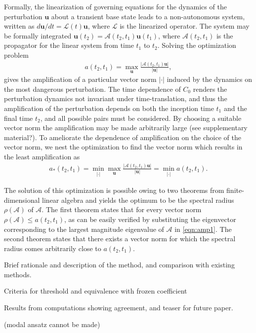 \documentclass[letterpaper,10pt,prl,twocolumn,aps,reprint]{revtex4-1}
\newcommand{\bu}{\boldsymbol{u}}
\newcommand{\cL}{\boldsymbol{\mathcal{L}}}
\newcommand{\cA}{\boldsymbol{\mathcal{A}}}
\begin{document}
Formally, the linearization of governing equations for the dynamics of the perturbation $\bu$ about a transient base state leads to a non-autonomous system, written as ${d\bu}/{dt} = \cL(t)\bu$, where $\cL$ is the linearized operator. The system may be formally integrated $\bu (t_2) = \cA(t_2, t_1) \bu(t_1)$, where $\cA(t_2, t_1)$ is the propagator for the linear system from time $t_1$ to $t_2$. Solving the optimization problem 
\begin{align}
a(t_2, t_1) = \max_{\bu} \frac{| \cA(t_2, t_1) \bu|}{|\bu|}, \label{eqn:amp1}
\end{align}
gives the amplification of a particular vector norm $|\cdot|$ induced by the dynamics on the most dangerous perturbation. The time dependence of $C_0$ renders the perturbation dynamics not invariant under time-translation, and thus the amplification of the perturbation depends on both the inception time $t_1$ and the final time $t_2$, and all possible pairs must be considered. By choosing a suitable vector norm the amplification may be made arbitrarily large (see supplementary material?). To ameliorate the dependence of amplification on the choice of the vector norm, we nest the optimization to find the vector norm which results in the least amplification as
\begin{align}
a_*(t_2, t_1) = \min_{|\cdot|} \max_{\bu} \frac{| \cA(t_2, t_1) \bu|}{|\bu|} = \min_{|\cdot|} a(t_2, t_1). \label{eqn:amp2}
\end{align}

The solution of this optimization is possible owing to two theorems from finite-dimensional linear algebra and yields the optimum to be the spectral radius $\rho(\cA)$ of $\cA$. The first theorem states that for every vector norm $\rho(\cA) \le a(t_2,t_1)$, as can be easily verified by substituting the eigenvector corresponding to the largest magnitude eigenvalue of $\cA$ in \eqref{eqn:amp1}. The second theorem states that there exists a vector norm for which the spectral radius comes arbitrarily close to $a(t_2,t_1)$. 

\vspace{1cm}
Brief rationale and description of the method, and comparison with existing methods.

Criteria for threshold and equivalence with frozen coefficient

Results from computations showing agreement, and teaser for future paper.

(modal ansatz cannot be made)


% 
\end{document}
